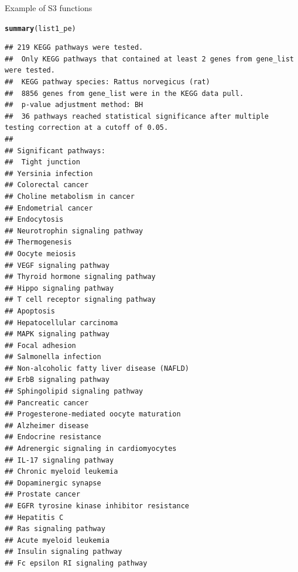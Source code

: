\documentclass[article]{jss}\usepackage[]{graphicx}\usepackage[]{color}
\makeatletter
\newcommand{\hlstd}[1]{\textcolor[rgb]{0.345,0.345,0.345}{#1}}%
\newcommand{\hlkwd}[1]{\textcolor[rgb]{0.737,0.353,0.396}{\textbf{#1}}}%
\newenvironment{kframe}{%
 \def\at@end@of@kframe{}%
 \ifinner\ifhmode%
  \def\at@end@of@kframe{\end{minipage}}%
  \begin{minipage}{\columnwidth}%
 \fi\fi%
 \def\FrameCommand##1{\hskip\@totalleftmargin \hskip-\fboxsep
 \colorbox{shadecolor}{##1}\hskip-\fboxsep
     \hskip-\linewidth \hskip-\@totalleftmargin \hskip\columnwidth}%
 \MakeFramed {\advance\hsize-\width
   \@totalleftmargin\z@ \linewidth\hsize
   \@setminipage}}%
 {\par\unskip\endMakeFramed%
 \at@end@of@kframe}
\newenvironment{knitrout}{}{} %
\makeatother
\begin{document}
Example of S3 functions
\begin{knitrout}
\color{fgcolor}\begin{kframe}
\begin{alltt}
\hlkwd{summary}\hlstd{(list1_pe)}
\end{alltt}
\begin{verbatim}
## 219 KEGG pathways were tested. 
##  Only KEGG pathways that contained at least 2 genes from gene_list were tested. 
##  KEGG pathway species: Rattus norvegicus (rat)
##  8856 genes from gene_list were in the KEGG data pull. 
##  p-value adjustment method: BH
##  36 pathways reached statistical significance after multiple testing correction at a cutoff of 0.05. 
##  
## Significant pathways: 
##  Tight junction
## Yersinia infection
## Colorectal cancer
## Choline metabolism in cancer
## Endometrial cancer
## Endocytosis
## Neurotrophin signaling pathway
## Thermogenesis
## Oocyte meiosis
## VEGF signaling pathway
## Thyroid hormone signaling pathway
## Hippo signaling pathway
## T cell receptor signaling pathway
## Apoptosis
## Hepatocellular carcinoma
## MAPK signaling pathway
## Focal adhesion
## Salmonella infection
## Non-alcoholic fatty liver disease (NAFLD)
## ErbB signaling pathway
## Sphingolipid signaling pathway
## Pancreatic cancer
## Progesterone-mediated oocyte maturation
## Alzheimer disease
## Endocrine resistance
## Adrenergic signaling in cardiomyocytes
## IL-17 signaling pathway
## Chronic myeloid leukemia
## Dopaminergic synapse
## Prostate cancer
## EGFR tyrosine kinase inhibitor resistance
## Hepatitis C
## Ras signaling pathway
## Acute myeloid leukemia
## Insulin signaling pathway
## Fc epsilon RI signaling pathway
\end{verbatim}
\end{kframe}
\end{knitrout}







\end{document}
